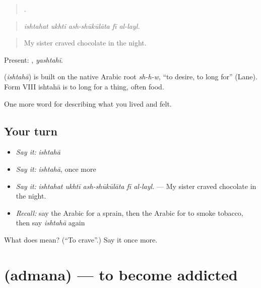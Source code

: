\begin{quote}
    .
\end{quote}

\begin{quote}
\emph{ishtahat ukhtī ash-shūkūlāta fī al-layl.}
\end{quote}

\begin{quote}
My sister craved chocolate in the night.
\end{quote}

Present: , \emph{yashtahī}.

\begin{cousinweb}
\textbf{} (\emph{ishtahā}) is built on the native Arabic root \emph{sh-h-w}, \textquotedblleft{}to desire, to long for\textquotedblright{} (Lane). Form VIII ishtahā is to long for a thing, often food.
\end{cousinweb}

\begin{grammarlens}[title={What you've built}]
One more word for describing what you lived and felt.
\end{grammarlens}

\subsection*{Your turn}
\begin{itemize}
\raggedright
  \item \emph{Say it:} \emph{ishtahā}
  \item \emph{Say it:} \emph{ishtahā}, once more
  \item \emph{Say it:} \emph{ishtahat ukhtī ash-shūkūlāta fī al-layl.} — My sister craved chocolate in the night.
  \item \emph{Recall:} say the Arabic for a sprain, then the Arabic for to smoke tobacco, then say \emph{ishtahā} again
\end{itemize}

\begin{tcolorbox}[breakable,colback=teal!4,colframe=teal!35!black,title={Before you move on}]
What does  mean? (\textquotedblleft{}To crave\textquotedblright{}.) Say it once more.
\end{tcolorbox}
\section[\texorpdfstring{\ar{أدمن} (admana)}{أدمن (admana)}]{ (admana) — to become addicted}

